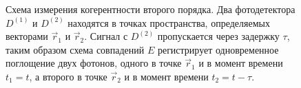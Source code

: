 \begin{figure}
\centering



\caption{Схема измерения когерентности второго порядка. Два
  фотодетектора $D^{(1)}$ и $D^{(2)}$ находятся в точках пространства,
  определяемых векторами $\vec{r}_1$ и $\vec{r}_2$. Сигнал с $D^{(2)}$
пропускается через задержку $\tau$, таким образом схема совпадений $E$
регистрирует одновременное поглощение двух фотонов, одного в точке
$\vec{r}_1$ и в момент времени $t_1 = t$, а второго в точке
$\vec{r}_2$ и в момент времени $t_2 = t - \tau$.}
\label{figPart4Ch2_add1}
\end{figure}
